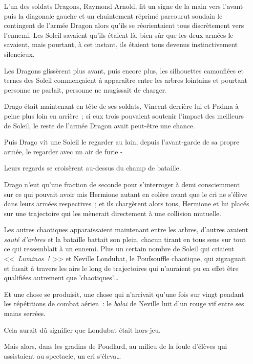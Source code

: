 \later

L'un des soldats Dragons, Raymond Arnold, fit un signe de la main vers l'avant puis la diagonale gauche et un chuintement réprimé parcourut soudain le contingent de l'armée Dragon alors qu'ils se réorientaient tous discrètement vers l'ennemi. Les Soleil savaient qu'ils étaient là, bien sûr que les deux armées le savaient, mais pourtant, à cet instant, ils étaient tous devenus instinctivement silencieux.

Les Dragons glissèrent plus avant, puis encore plus, les silhouettes camouflées et ternes des Soleil commençaient à apparaître entre les arbres lointains et pourtant personne ne parlait, personne ne mugissait de charger.

Drago était maintenant en tête de ses soldats, Vincent derrière lui et Padma à peine plus loin en arrière~; si eux trois pouvaient soutenir l'impact des meilleurs de Soleil, le reste de l'armée Dragon avait peut-être une chance.

Puis Drago vit une Soleil le regarder au loin, depuis l'avant-garde de sa propre armée, le regarder avec un air de furie -

Leurs regards se croisèrent au-dessus du champ de bataille.

Drago n'eut qu'une fraction de seconde pour s'interroger à demi consciemment sur ce qui pouvait avoir mis Hermione autant en colère avant que le cri ne s'élève dans leurs armées respectives~; et ils chargèrent alors tous, Hermione et lui placés sur une trajectoire qui les mènerait directement à une collision mutuelle.

\later

Les autres chaotiques apparaissaient maintenant entre les arbres, d'autres avaient \emph{sauté d'arbres} et la bataille battait son plein, chacun tirant en tous sens sur tout ce qui ressemblait à un ennemi. Plus un certain nombre de Soleil qui criaient <<~\emph{Luminos~!}~>> et Neville Londubat, le Poufsouffle chaotique, qui zigzaguait et fusait à travers les airs le long de trajectoires qui n'auraient pu en effet être qualifiées autrement que 'chaotiques'…

Et une chose se produisit, une chose qui n'arrivait qu'une fois sur vingt pendant les répétitions de combat aérien~: le \emph{balai} de Neville luit d'un rouge vif entre ses mains serrées.

Cela aurait dû signifier que Londubat était hors-jeu.

Mais alors, dans les gradins de Poudlard, au milieu de la foule d'élèves qui assistaient au spectacle, un cri s'éleva…

